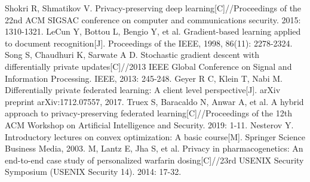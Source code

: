 \documentclass[12pt,openany,a4paper,fancyhdr,oneside]{ctexbook}
\begin{document}
\begin{thebibliography}{99}
Shokri R, Shmatikov V. Privacy-preserving deep learning[C]//Proceedings of the 22nd ACM SIGSAC conference on computer and communications security. 2015: 1310-1321.
LeCun Y, Bottou L, Bengio Y, et al. Gradient-based learning applied to document recognition[J]. Proceedings of the IEEE, 1998, 86(11): 2278-2324.
Song S, Chaudhuri K, Sarwate A D. Stochastic gradient descent with differentially private updates[C]//2013 IEEE Global Conference on Signal and Information Processing. IEEE, 2013: 245-248.
Geyer R C, Klein T, Nabi M. Differentially private federated learning: A client level perspective[J]. arXiv preprint arXiv:1712.07557, 2017.
Truex S, Baracaldo N, Anwar A, et al. A hybrid approach to privacy-preserving federated learning[C]//Proceedings of the 12th ACM Workshop on Artificial Intelligence and Security. 2019: 1-11.
Nesterov Y. Introductory lectures on convex optimization: A basic course[M]. Springer Science Business Media, 2003.
  M, Lantz E, Jha S, et al. Privacy in pharmacogenetics: An end-to-end case study of personalized warfarin dosing[C]//23rd {USENIX} Security Symposium ({USENIX} Security 14). 2014: 17-32.



\end{thebibliography}


\pagestyle{plain}
\clearpage
{}
{}


\pagestyle{plain}
\clearpage
{}
{}



\printindex
\end{document}
